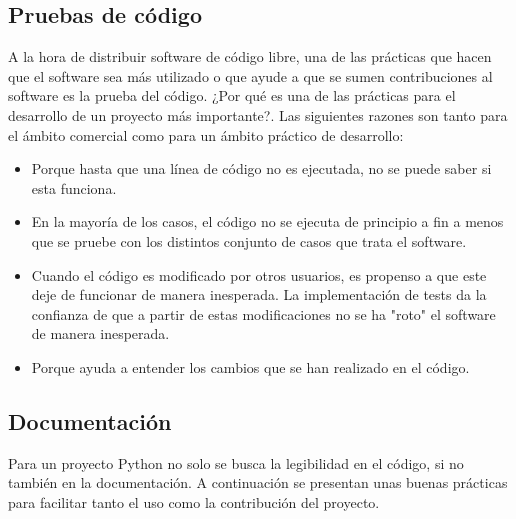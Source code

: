 \subsection*{Pruebas de código}
A la hora de distribuir software de código libre, una de las prácticas que hacen que el software sea más utilizado o que ayude a que se sumen contribuciones al software es la prueba del código. ¿Por qué es una de las prácticas para el desarrollo de un proyecto más importante?. Las siguientes razones son tanto para el ámbito comercial como para un ámbito práctico de desarrollo: 
\begin{itemize}
    \item Porque hasta que una línea de código no es ejecutada, no se puede saber si esta funciona.
    \item En la mayoría de los casos, el código no se ejecuta de principio a fin a menos que se pruebe con los distintos conjunto de casos que trata el software.
    \item Cuando el código es modificado por otros usuarios, es propenso a que este deje de funcionar de manera inesperada. La implementación de tests da la confianza de que a partir de estas modificaciones no se ha "roto" el software de manera inesperada.
    \item Porque ayuda a entender los cambios que se han realizado en el código.
    
\end{itemize}

\subsection*{Documentación}
Para un proyecto Python no solo se busca la legibilidad en el código, si no también en la documentación. A continuación se presentan unas buenas prácticas para facilitar tanto el uso como la contribución del proyecto. 
